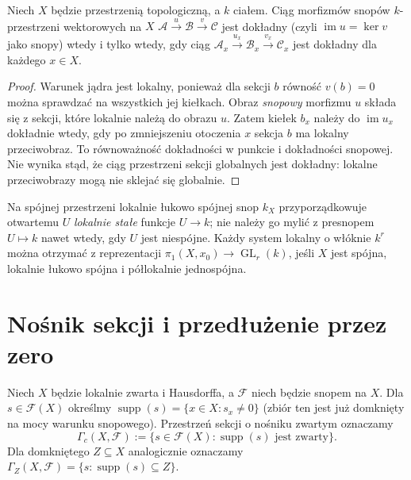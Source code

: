 \begin{lemat}
\label{lem:stalk-exact-v12}
Niech $X$ będzie przestrzenią topologiczną,
a $k$ ciałem. Ciąg morfizmów snopów
$k$-przestrzeni wektorowych na $X$
$\mathcal A\xrightarrow{u}\mathcal B\xrightarrow{v}\mathcal C$
jest dokładny (czyli $\operatorname{im}u=\ker v$ jako snopy)
wtedy i tylko wtedy, gdy ciąg
$\mathcal A_x\xrightarrow{u_x}\mathcal B_x\xrightarrow{v_x}\mathcal C_x$
jest dokładny dla każdego $x\in X$.
\end{lemat}
\begin{proof}
Warunek jądra jest lokalny, ponieważ dla sekcji $b$ równość $v(b)=0$
można sprawdzać na wszystkich jej kiełkach. Obraz \emph{snopowy}
morfizmu $u$ składa się z sekcji, które lokalnie należą do obrazu $u$.
Zatem kiełek $b_x$ należy do $\operatorname{im}u_x$ dokładnie wtedy,
gdy po zmniejszeniu otoczenia $x$ sekcja $b$ ma lokalny przeciwobraz.
To równoważność dokładności w punkcie i dokładności snopowej.
Nie wynika stąd, że ciąg przestrzeni sekcji globalnych jest dokładny:
lokalne przeciwobrazy mogą nie sklejać się globalnie.
\end{proof}

\begin{przyklad}
Na spójnej przestrzeni lokalnie łukowo spójnej snop $k_X$
przyporządkowuje otwartemu $U$ \emph{lokalnie stałe} funkcje $U\to k$;
nie należy go mylić z presnopem $U\mapsto k$ nawet wtedy,
gdy $U$ jest niespójne. Każdy system lokalny o włóknie $k^r$
można otrzymać z reprezentacji
$\pi_1(X,x_0)\to\operatorname{GL}_r(k)$,
jeśli $X$ jest spójna, lokalnie łukowo spójna i półlokalnie jednospójna.
\end{przyklad}

\section{Nośnik sekcji i przedłużenie przez zero}
\begin{definicja}
\label{def:gamma-c-v12}
Niech $X$ będzie lokalnie zwarta i Hausdorffa, a $\mathcal F$
niech będzie snopem na $X$. Dla $s\in\mathcal F(X)$ określmy
$\operatorname{supp}(s)=\{x\in X:s_x\ne0\}$
(zbiór ten jest już domknięty na mocy warunku snopowego).
Przestrzeń sekcji o nośniku zwartym oznaczamy
\[\Gamma_c(X,\mathcal F)
  :=\{s\in\mathcal F(X):\operatorname{supp}(s)\text{ jest zwarty}\}.\]
Dla domkniętego $Z\subseteq X$ analogicznie oznaczamy
$\Gamma_Z(X,\mathcal F)=\{s:\operatorname{supp}(s)\subseteq Z\}$.
\end{definicja}

